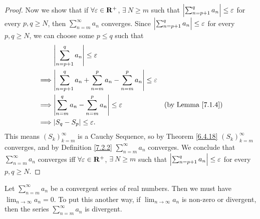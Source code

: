 \begin{proof}
    Now we show that if \(\forall \varepsilon \in \mathbf{R}^+\), \(\exists\ N \geq m\) such that \(\left\lvert\sum_{n = p + 1}^q a_n\right\rvert \leq \varepsilon\) for every \(p, q \geq N\), then \(\sum_{n = m}^\infty a_n\) converges.
    Since \(\left\lvert\sum_{n = p + 1}^q a_n\right\rvert \leq \varepsilon\) for every \(p, q \geq N\), we can choose some \(p \leq q\) such that
    \begin{align*}
                 & \abs{\sum_{n = p + 1}^q a_n} \leq \varepsilon                                                                           \\
        \implies & \abs{\sum_{n = p + 1}^q a_n + \sum_{n = m}^p a_n - \sum_{n = m}^p a_n} \leq \varepsilon                                 \\
        \implies & \abs{\sum_{n = m}^q a_n - \sum_{n = m}^p a_n} \leq \varepsilon                          & \text{(by Lemma \ref{7.1.4})} \\
        \implies & \abs{S_q - S_p} \leq \varepsilon.
    \end{align*}
    This means \((S_k)_{k = m}^\infty\) is a Cauchy Sequence, so by Theorem \ref{6.4.18} \((S_k)_{k = m}^\infty\) converges, and by Definition \ref{7.2.2} \(\sum_{n = m}^\infty a_n\) converges.
    We conclude that \(\sum_{n = m}^\infty a_n\) converges iff \(\forall \varepsilon \in \mathbf{R}^+\), \(\exists\ N \geq m\) such that \(\left\lvert\sum_{n = p + 1}^q a_n\right\rvert \leq \varepsilon\) for every \(p, q \geq N\).
\end{proof}

\begin{corollary}\label{7.2.6}
    Let \(\sum_{n = m}^\infty a_n\) be a convergent series of real numbers.
    Then we must have \(\lim_{n \to \infty} a_n = 0\).
    To put this another way, if \(\lim_{n \to \infty} a_n\) is non-zero or divergent, then the series \(\sum_{n = m}^\infty a_n\) is divergent.
\end{corollary}

